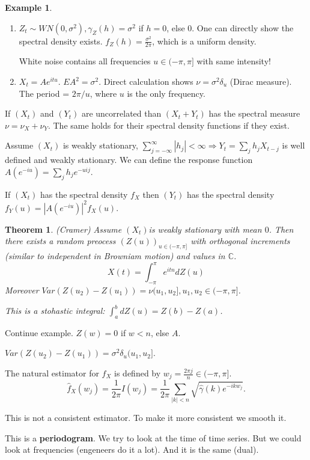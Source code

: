 \documentclass[12pt,a4paper]{amsart}
\theoremstyle{definition} %
\newtheorem{example}[defn]{Example}
\theoremstyle{plain} %
\newtheorem{theorem}[defn]{Theorem}
\newcommand{\C}{\mathbb C}
\begin{document}
\begin{example}
\begin{enumerate}
\item $Z_t \sim WN(0, \sigma^2), \gamma_Z(h) = \sigma^2$ if $h = 0$, else $0$. One can directly show the spectral density exists. $f_Z(h) = \frac{\sigma^2}{2 \pi}$, which is a uniform density. 

White noise contains all frequencies $u \in (-\pi, \pi]$ with same intensity! 
\item $X_t = A e^{i t u}$. $E A^2 = \sigma^2$. Direct calculation shows $\nu = \sigma^2 \delta_u$ (Dirac measure). The period = $2 \pi / u$, where $u$ is the only frequency. 
\end{enumerate}
\vskip0.5cm

If $(X_t)$ and $(Y_t)$ are uncorrelated than  $(X_t + Y_t)$ has the spectral measure $\nu = \nu_X + \nu_Y$. The same holds for their spectral density functions if they exist. 

Assume $(X_t)$ is weakly stationary, $\sum_{j=-\infty}^\infty |h_j| < \infty \Rightarrow Y_t = \sum_j h_j X_{t-j}$ is well defined and weakly stationary. We can define the response function $A(e^{-iu}) = \sum_j h_j e^{-uij}$.

If $(X_t)$ has the spectral density $f_X$ then $(Y_t)$ has the spectral density $f_Y(u) = |A(e^{-iu})|^2 f_X(u)$. 

\begin{theorem} (Cramer)
Assume $(X_t)$is weakly stationary with mean $0$. Then there exists a random preocess $(Z(u))_{u \in(-\pi, \pi]}$ with orthogonal increments (similar to independent in Browniam motion) and values in $\C$. 
$$ X(t) = \int_{-\pi}^\pi e^{itn}dZ(u)$$
Moreover $Var(Z(u_2) - Z(u_1)) = \nu(u_1, u_2], u_1, u_2 \in (-\pi,\pi]$.

This is a stohastic integral:
$\int_a^bdZ(u) = Z(b) - Z(a)$.
\end{theorem}

Continue example.
$Z(w) = 0$ if $w < n$, else $A$. 

$Var(Z(u_2) - Z(u_1)) = \sigma^2 \delta_u(u_1, u_2]$.

The natural estimator for $f_X$ is defined by $w_j = \frac{2 \pi j}{n} \in (-\pi, \pi]$.
$$\hat{f}_X(w_j) =\frac{1}{2\pi} I(w_j)= \frac{1}{2\pi} \sum_{|k| < n} \sqrt{\hat{\gamma}(k)e^{-ikw_j}}.$$

This is not a consistent estimator. To make it more consistent we smooth it. 

This is a {\bf periodogram}. We try to look at the time of time series. But we could look at frequencies (engeneers do it a lot). And it is the same (dual). 
\end{example}
\end{document}
